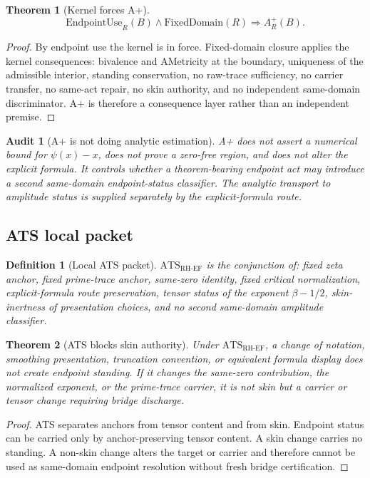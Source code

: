 \documentclass[11pt]{article}
\newtheorem{definition}{Definition}[section]
\newtheorem{theorem}{Theorem}[section]
\newtheorem{audit}{Audit}[section]
\newcommand{\RH}{\mathrm{RH}}
\newcommand{\EF}{\mathrm{EF}}
\newcommand{\EndpointUse}{\mathrm{EndpointUse}}
\newcommand{\FixedDomain}{\mathrm{FixedDomain}}
\newcommand{\Aplus}{A^+}
\newcommand{\ATS}{\mathrm{ATS}}
\begin{document}
\begin{theorem}[Kernel forces A+]
\[
\EndpointUse_R(B)\wedge \FixedDomain(R)\Rightarrow \Aplus_R(B).
\]
\end{theorem}

\begin{proof}
By endpoint use the kernel is in force.  Fixed-domain closure applies the kernel consequences: bivalence and AMetricity at the boundary, uniqueness of the admissible interior, standing conservation, no raw-trace sufficiency, no carrier transfer, no same-act repair, no skin authority, and no independent same-domain discriminator.  A+ is therefore a consequence layer rather than an independent premise.
\end{proof}

\begin{audit}[A+ is not doing analytic estimation]
A+ does not assert a numerical bound for \(\psi(x)-x\), does not prove a zero-free region, and does not alter the explicit formula.  It controls whether a theorem-bearing endpoint act may introduce a second same-domain endpoint-status classifier.  The analytic transport to amplitude status is supplied separately by the explicit-formula route.
\end{audit}

\subsection{ATS local packet}

\begin{definition}[Local ATS packet]
\(\ATS_{\RH\text{-}\EF}\) is the conjunction of: fixed zeta anchor, fixed prime-trace anchor, same-zero identity, fixed critical normalization, explicit-formula route preservation, tensor status of the exponent \(\beta-1/2\), skin-inertness of presentation choices, and no second same-domain amplitude classifier.
\end{definition}

\begin{theorem}[ATS blocks skin authority]
Under \(\ATS_{\RH\text{-}\EF}\), a change of notation, smoothing presentation, truncation convention, or equivalent formula display does not create endpoint standing.  If it changes the same-zero contribution, the normalized exponent, or the prime-trace carrier, it is not skin but a carrier or tensor change requiring bridge discharge.
\end{theorem}

\begin{proof}
ATS separates anchors from tensor content and from skin.  Endpoint status can be carried only by anchor-preserving tensor content.  A skin change carries no standing.  A non-skin change alters the target or carrier and therefore cannot be used as same-domain endpoint resolution without fresh bridge certification.
\end{proof}
\end{document}
